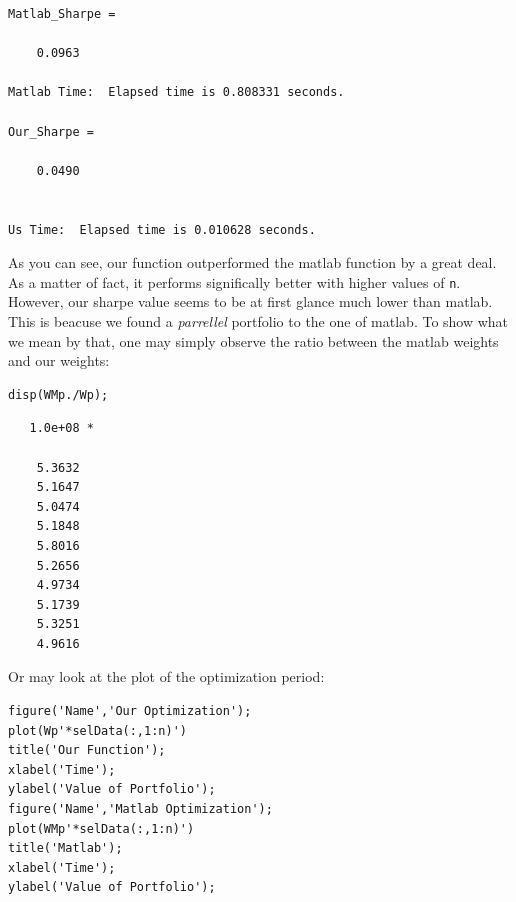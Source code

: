 \documentclass[12pt,titlepage,a4paper]{article}
\begin{document}
        \color{lightgray} \begin{verbatim}
Matlab_Sharpe =

    0.0963

Matlab Time:  Elapsed time is 0.808331 seconds.

Our_Sharpe =

    0.0490


Us Time:  Elapsed time is 0.010628 seconds.
\end{verbatim} \color{black}
    \begin{par}
As you can see, our function outperformed the matlab function by a great deal. As a matter of fact, it performs significally better with higher values of \texttt{n}. However, our sharpe value seems to be at first glance much lower than matlab. This is beacuse we found a \textit{parrellel} portfolio to the one of matlab. To show what we mean by that, one may simply observe the ratio between the matlab weights and our weights:
\end{par} \vspace{1em}
\begin{verbatim}
disp(WMp./Wp);
\end{verbatim}

        \color{lightgray} \begin{verbatim}   1.0e+08 *

    5.3632
    5.1647
    5.0474
    5.1848
    5.8016
    5.2656
    4.9734
    5.1739
    5.3251
    4.9616

\end{verbatim} \color{black}
    \begin{par}
Or may look at the plot of the optimization period:
\end{par} \vspace{1em}
\begin{verbatim}
figure('Name','Our Optimization');
plot(Wp'*selData(:,1:n)')
title('Our Function');
xlabel('Time');
ylabel('Value of Portfolio');
figure('Name','Matlab Optimization');
plot(WMp'*selData(:,1:n)')
title('Matlab');
xlabel('Time');
ylabel('Value of Portfolio');
\end{verbatim}
\end{document}
